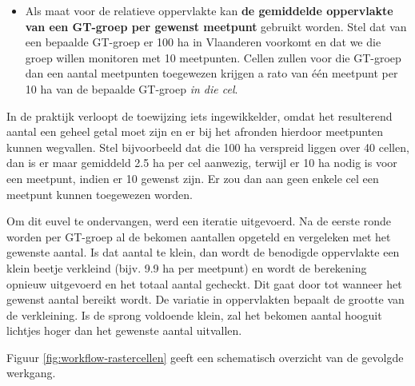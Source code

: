 \documentclass[11pt,]{book}
\providecommand{\tightlist}{%
  \setlength{\itemsep}{0pt}\setlength{\parskip}{0pt}}
\begin{document}
\begin{itemize}
  \begin{itemize}
  \tightlist
  \item
    Als maat voor de relatieve oppervlakte kan \textbf{de gemiddelde
    oppervlakte van een GT-groep per gewenst meetpunt} gebruikt worden.
    Stel dat van een bepaalde GT-groep er 100 ha in Vlaanderen voorkomt
    en dat we die groep willen monitoren met 10 meetpunten. Cellen
    zullen voor die GT-groep dan een aantal meetpunten toegewezen
    krijgen a rato van één meetpunt per 10 ha van de bepaalde GT-groep
    \emph{in die cel}.
  \end{itemize}
\end{itemize}

In de praktijk verloopt de toewijzing iets ingewikkelder, omdat het
resulterend aantal een geheel getal moet zijn en er bij het afronden
hierdoor meetpunten kunnen wegvallen. Stel bijvoorbeeld dat die 100 ha
verspreid liggen over 40 cellen, dan is er maar gemiddeld 2.5 ha per cel
aanwezig, terwijl er 10 ha nodig is voor een meetpunt, indien er 10
gewenst zijn. Er zou dan aan geen enkele cel een meetpunt kunnen
toegewezen worden.

Om dit euvel te ondervangen, werd een iteratie uitgevoerd. Na de eerste
ronde worden per GT-groep al de bekomen aantallen opgeteld en vergeleken
met het gewenste aantal. Is dat aantal te klein, dan wordt de benodigde
oppervlakte een klein beetje verkleind (bijv. 9.9 ha per meetpunt) en
wordt de berekening opnieuw uitgevoerd en het totaal aantal gecheckt.
Dit gaat door tot wanneer het gewenst aantal bereikt wordt. De variatie
in oppervlakten bepaalt de grootte van de verkleining. Is de sprong
voldoende klein, zal het bekomen aantal hooguit lichtjes hoger dan het
gewenste aantal uitvallen.

Figuur \ref{fig:workflow-rastercellen} geeft een schematisch overzicht
van de gevolgde werkgang.
\end{document}
